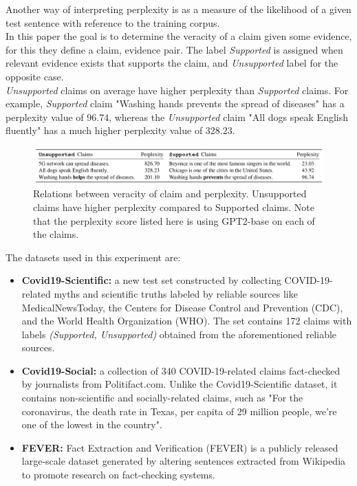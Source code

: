 \documentclass[10pt, english]{report}
\begin{document}
Another way of interpreting perplexity is as a measure of the likelihood of a given test sentence with reference to the training corpus.\\

In this paper the goal is to determine the veracity of a claim given some evidence, for this they define a {claim, evidence} pair. The label \emph{Supported} is assigned when relevant evidence exists that supports the claim, and \emph{Unsupported} label for the opposite case.\\
\emph{Unsupported} claims on average have higher perplexity than \emph{Supported} claims. For example, \emph{Supported} claim "Washing hands prevents the spread of diseases" has a perplexity value of 96.74, whereas the \emph{Unsupported} claim "All dogs speak English fluently" has a much higher perplexity value of 328.23. 

\begin{figure}[H]
	\centering
	\includegraphics[scale=0.43]{img/supported_unsupported_perplexity.png}
	\caption{Relations between veracity of claim and perplexity. Unsupported claims have higher perplexity compared to Supported claims. Note that the perplexity score listed here is using GPT2-base on each of the claims. \cite{lee2021towards}}
\end{figure}

The datasets used in this experiment are:

\begin{itemize}
\item \textbf{Covid19-Scientific:} a new test set constructed by collecting COVID-19-related myths and scientific truths labeled by reliable sources like MedicalNewsToday, the Centers for Disease Control and Prevention (CDC), and the World Health Organization (WHO). The set contains 172 claims with labels \emph{(Supported, Unsupported)} obtained from the aforementioned reliable sources.
\item \textbf{Covid19-Social:} a collection of 340 COVID-19-related claims fact-checked by journalists from Politifact.com. Unlike the Covid19-Scientific dataset, it contains non-scientific and socially-related claims, such as "For the coronavirus, the death rate in Texas, per capita of 29 million people, we're one of the lowest in the country".
\item \textbf{FEVER:} Fact Extraction and Verification (FEVER) is a publicly released large-scale dataset generated by altering sentences extracted from Wikipedia to promote research on fact-checking systems.
\end{itemize}
\end{document}
